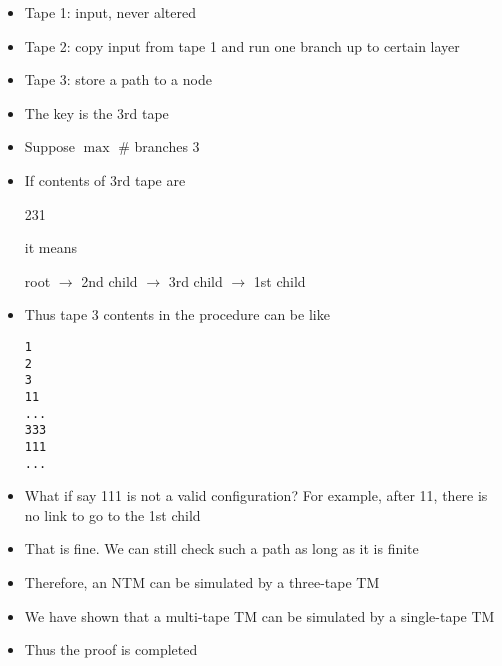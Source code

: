 \begin{frame}
\begin{itemize}
\begin{center}
\end{center}
  
\item 
Tape 1: input, never altered

\item
  Tape 2: copy input from tape 1 and run one branch up to certain layer
  
\item
  Tape 3: store a path to a node

\item
  The key is the 3rd tape

\item
  Suppose $\max$ \# branches 3

\item If contents of 3rd tape are
  \begin{center}
    231
  \end{center}
  it means
  \begin{center}
      root $\rightarrow$ 2nd child $\rightarrow$ 3rd child $\rightarrow$ 1st child
  \end{center}
\item Thus tape 3 contents in the procedure can be like
\begin{alltt}
1
2
3
11
...
333
111
...
\end{alltt}
\item What if say 111 is not a valid configuration? For example,
  after 11, there is no link to go to the 1st child
\item That is fine. We can still check such a path as long as it
  is finite
\item Therefore, an NTM can be simulated by a three-tape TM
\item
  We have shown that a multi-tape TM can be simulated
  by a single-tape TM
\item
  Thus the proof is completed
\end{itemize}\end{frame}


